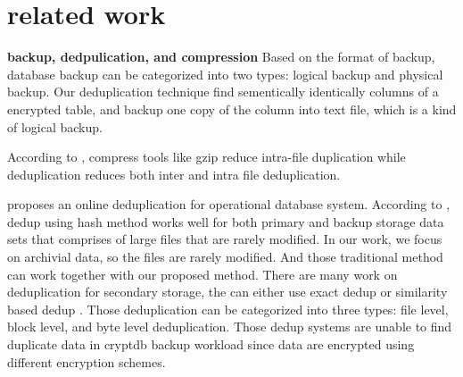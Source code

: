 \section{related work}



\textbf{backup, dedpulication, and compression} Based on the format of backup, database backup can be categorized into two types: logical backup and physical backup\citep{mysqlbackup}. Our deduplication technique find sementically identically columns of a encrypted table, and backup one copy of the column into text file, which is a kind of logical backup. 



According to \citep{mandagere2008demystifying}, compress tools like gzip reduce intra-file duplication while deduplication reduces both inter and intra file deduplication.

\citep{xu2017online} proposes an online deduplication for operational database system. According to \citep{xu2017online}, dedup using hash method works well for both primary and backup storage data sets that comprises of large files that are rarely modified. In our work, we focus on archivial data, so the files are rarely modified. And those traditional method can work together with our proposed method. There are many work on deduplication for secondary storage, the can either use exact dedup\citep{dubnicki2009hydrastor} or similarity based dedup\citep{xu2015reducing} \citep{aronovich2009design}\citep{you2005deep}. Those deduplication can be categorized into three types: file level, block level, and byte level deduplication. Those dedup systems are unable to find duplicate data in cryptdb backup workload since data are encrypted using different encryption schemes.






